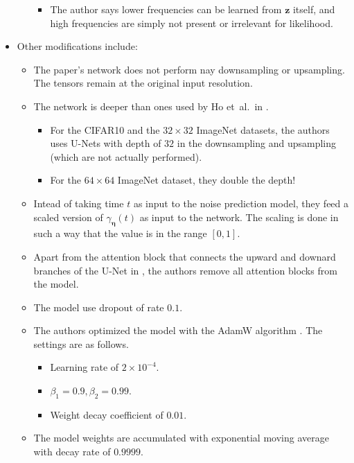\documentclass[10pt]{article}
\newcommand{\ve}[1]{\mathbf{#1}}
\newcommand{\ves}[1]{\boldsymbol{#1}}
\newcommand{\etal}{{et~al.}}
\begin{document}
\begin{itemize}
\begin{itemize}
\begin{itemize}
      \item The author says lower frequencies can be learned from $\ve{z}$ itself, and high frequencies are simply not present or irrelevant for likelihood.    
    \end{itemize}    
  \end{itemize}
  
  \item Other modifications include:
  \begin{itemize}
    \item The paper's network does not perform nay downsampling or upsampling. The tensors remain at the original input resolution.
    
    \item The network is deeper than ones used by Ho \etal\ in \cite{Ho:2020}.
    \begin{itemize}
      \item For the CIFAR10 and the $32\times32$ ImageNet datasets, the authors uses U-Nets with depth of $32$ in the downsampling and upsampling (which are not actually performed).
    
      \item For the $64\times64$  ImageNet dataset, they double the depth!
    \end{itemize}
    
    \item Intead of taking time $t$ as input to the noise prediction model, they feed a scaled version of $\gamma_{\ves{\eta}}(t)$ as input to the network. The scaling is done in such a way that the value is in the range $[0,1]$.
    
    \item Apart from the attention block that connects the upward and downard branches of the U-Net in \cite{Ho:2020}, the authors remove all attention blocks from the model.
    
    \item The model use dropout of rate $0.1$.
    
    \item The authors optimized the model with the AdamW algorithm \cite{Loshchilov:2017}. The settings are as follows.
    \begin{itemize}
      \item Learning rate of $2 \times 10^{-4}$.
      \item $\beta_1 = 0.9, \beta_2 = 0.99$.
      \item Weight decay coefficient of $0.01$.
    \end{itemize}    
    
    \item The model weights are accumulated with exponential moving average with decay rate of $0.9999$.
  \end{itemize}
\end{itemize}
\end{document}
